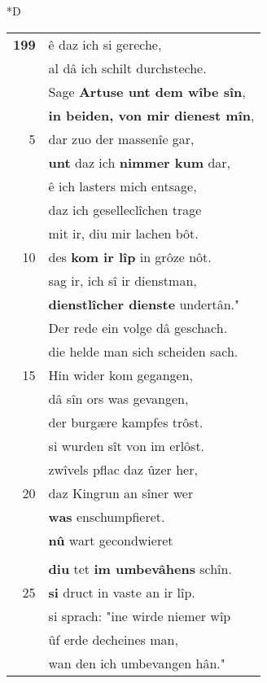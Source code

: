 \documentclass[8pt,a4paper,notitlepage]{article}
\begin{document}
\begin{table}[ht]
\begin{minipage}[t]{0.5\linewidth}
\small
\begin{center}*D
\end{center}
\begin{tabular}{rl}
\textbf{199} & ê daz ich si gereche,\\ 
 & al dâ ich schilt durchsteche.\\ 
 & Sage \textbf{Artuse unt dem wîbe sîn},\\ 
 & \textbf{in beiden, von mir dienest mîn},\\ 
5 & dar zuo der massenîe gar,\\ 
 & \textbf{unt} daz ich \textbf{nimmer kum} dar,\\ 
 & ê ich lasters mich entsage,\\ 
 & daz ich geselleclîchen trage\\ 
 & mit ir, diu mir lachen bôt.\\ 
10 & des \textbf{kom ir lîp} in grôze nôt.\\ 
 & sag ir, ich sî ir dienstman,\\ 
 & \textbf{dienstlîcher dienste} undertân."\\ 
 & Der rede ein volge dâ geschach.\\ 
 & die helde man sich scheiden sach.\\ 
15 & Hin wider kom gegangen,\\ 
 & dâ sîn ors was gevangen,\\ 
 & der burgære kampfes trôst.\\ 
 & si wurden sît von im erlôst.\\ 
 & zwîvels pflac daz ûzer her,\\ 
20 & daz Kingrun an sîner wer\\ 
 & \textbf{was} enschumpfieret.\\ 
 & \textbf{nû} wart gecondwieret\\ 
 & \textit{\begin{large}P\end{large}}arzival zer künegîn.\\ 
 & \textbf{diu} tet \textbf{im umbevâhens} schîn.\\ 
25 & \textbf{si} druct in vaste an ir lîp.\\ 
 & si sprach: "ine wirde niemer wîp\\ 
 & ûf erde decheines man,\\ 
 & wan den ich umbevangen hân."\\ 

\end{tabular}
\end{minipage}
\end{table}
\end{document}
